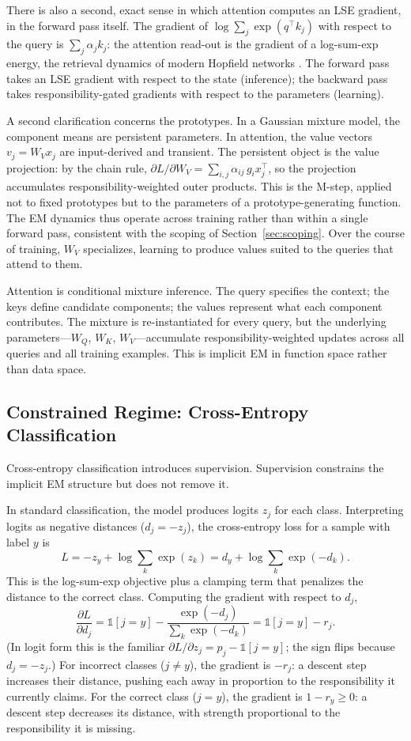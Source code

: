 There is also a second, exact sense in which attention computes an LSE gradient, in the forward pass itself. The gradient of $\log \sum_j \exp(q^\top k_j)$ with respect to the query is $\sum_j \alpha_j k_j$: the attention read-out is the gradient of a log-sum-exp energy, the retrieval dynamics of modern Hopfield networks \citep{ramsauer2020hopfield}. The forward pass takes an LSE gradient with respect to the state (inference); the backward pass takes responsibility-gated gradients with respect to the parameters (learning).

A second clarification concerns the prototypes. In a Gaussian mixture model, the component means are persistent parameters. In attention, the value vectors $v_j = W_V x_j$ are input-derived and transient. The persistent object is the value projection: by the chain rule, $\partial L / \partial W_V = \sum_{i,j} \alpha_{ij} \, g_i x_j^\top$, so the projection accumulates responsibility-weighted outer products. This is the M-step, applied not to fixed prototypes but to the parameters of a prototype-generating function. The EM dynamics thus operate across training rather than within a single forward pass, consistent with the scoping of Section~\ref{sec:scoping}. Over the course of training, $W_V$ specializes, learning to produce values suited to the queries that attend to them.

Attention is conditional mixture inference. The query specifies the context; the keys define candidate components; the values represent what each component contributes. The mixture is re-instantiated for every query, but the underlying parameters---$W_Q$, $W_K$, $W_V$---accumulate responsibility-weighted updates across all queries and all training examples. This is implicit EM in function space rather than data space.

\subsection{Constrained Regime: Cross-Entropy Classification}
\label{sec:constrained}

Cross-entropy classification introduces supervision. Supervision constrains the implicit EM structure but does not remove it.

In standard classification, the model produces logits $z_j$ for each class. Interpreting logits as negative distances ($d_j = -z_j$), the cross-entropy loss for a sample with label $y$ is
\[
L = -z_y + \log \sum_k \exp(z_k) = d_y + \log \sum_k \exp(-d_k).
\]
This is the log-sum-exp objective plus a clamping term that penalizes the distance to the correct class. Computing the gradient with respect to $d_j$,
\[
\frac{\partial L}{\partial d_j} = \mathbb{1}[j = y] - \frac{\exp(-d_j)}{\sum_k \exp(-d_k)} = \mathbb{1}[j = y] - r_j.
\]
(In logit form this is the familiar $\partial L / \partial z_j = p_j - \mathbb{1}[j=y]$; the sign flips because $d_j = -z_j$.) For incorrect classes ($j \neq y$), the gradient is $-r_j$: a descent step increases their distance, pushing each away in proportion to the responsibility it currently claims. For the correct class ($j = y$), the gradient is $1 - r_y \geq 0$: a descent step decreases its distance, with strength proportional to the responsibility it is missing.

